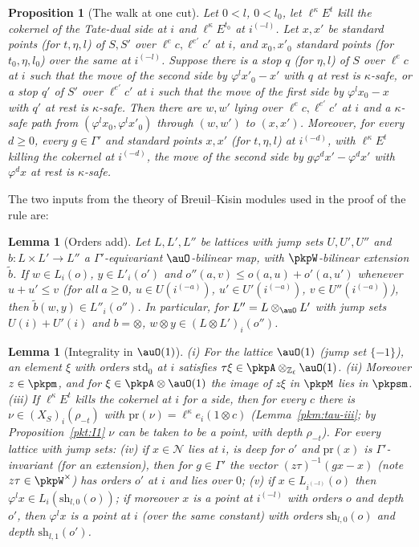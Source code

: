 \documentclass[10pt]{amsart}
\newtheorem{proposition}[theorem]{Proposition}
\newtheorem{lemma}[theorem]{Lemma}
\theoremstyle{definition}
\theoremstyle{remark}
\newcommand{\Z}{\mathbb Z}
\begin{document}
\begin{proposition}[The walk at one cut]\label{pkp:cut}
Let $0<l$, $0<l_0$, let $\ell^\kappa E^t$ kill the cokernel of the Tate-dual side at $i$ and
$\ell^\kappa E^{t_0}$ at $i^{(-l)}$. Let $x,x'$ be standard points (for $t,\eta,l$) of $S,S'$ over
$\ell^ec,\ell^{e'}c'$ at $i$, and $x_0,x'_0$ standard points (for $t_0,\eta,l_0$) over the same at
$i^{(-l)}$. Suppose there is a stop $q$ (for $\eta,l$) of $S$ over $\ell^ec$ at $i$ such that the move
of the second side by $\varphi^lx'_0-x'$ with $q$ at rest is $\kappa$-safe, or a stop $q'$ of $S'$
over $\ell^{e'}c'$ at $i$ such that the move of the first side by $\varphi^lx_0-x$ with $q'$ at rest
is $\kappa$-safe. Then there are $w,w'$ lying over $\ell^ec,\ell^{e'}c'$ at $i$ and a $\kappa$-safe
path from $(\varphi^lx_0,\varphi^lx'_0)$ through $(w,w')$ to $(x,x')$. Moreover, for every $d\ge0$,
every $g\in\Gamma'$ and standard points $x,x'$ (for $t,\eta,l$) at $i^{(-d)}$, with $\ell^\kappa E^t$
killing the cokernel at $i^{(-d)}$, the move of the second side by
$g\varphi^dx'-\varphi^dx'$ with $\varphi^dx$ at rest is $\kappa$-safe.
\end{proposition}

The two inputs from the theory of Breuil--Kisin modules used in the proof of the rule are:

\begin{lemma}[Orders add]\label{pkp:orders-add}
Let $L,L',L''$ be lattices with jump sets $U,U',U''$ and $b\colon L\times L'\to L''$ a
$\Gamma'$-equivariant $\auO$-bilinear map, with $\pkpW$-bilinear extension $\tilde b$. If $w\in L_i(o)$,
$y\in L'_i(o')$ and $o''(a,v)\le o(a,u)+o'(a,u')$ whenever $u+u'\le v$ (for all $a\ge0$,
$u\in U(i^{(-a)})$, $u'\in U'(i^{(-a)})$, $v\in U''(i^{(-a)})$), then $\tilde b(w,y)\in L''_i(o'')$.
In particular, for $L''=L\otimes_\auO L'$ with jump sets $U(i)+U'(i)$ and $b=\otimes$,
$w\otimes y\in(L\otimes L')_i(o'')$.
\end{lemma}

\begin{lemma}[Integrality in $\auO(1)$]\label{pkp:tau}
(i) For the lattice $\auO(1)$ (jump set $\{-1\}$), an element $\xi$ with orders $\mathrm{std}_0$ at $i$
satisfies $\tau\xi\in\pkpA\otimes_{\Z_\ell}\auO(1)$. (ii) Moreover $z\in\pkpm$, and for $\xi\in
\pkpA\otimes\auO(1)$ the image of $z\xi$ in $\pkpM$ lies in $\pkpsm$. (iii) If $\ell^\kappa E^t$ kills the
cokernel at $i$ for a side, then for every $c$ there is $\nu\in(X_S)_i(\rho_{-t})$ with
$\mathrm{pr}(\nu)=\ell^\kappa e_i(1\otimes c)$ (Lemma~\ref{pkm:tau-iii}; by Proposition~\ref{pkt:I1}
$\nu$ can be taken to be a point, with depth $\rho_{-t}$). For every lattice with jump sets: (iv) if $x\in\mathcal N$ lies at $i$,
is deep for $o'$ and $\mathrm{pr}(x)$ is $\Gamma'$-invariant (for an extension), then for $g\in\Gamma'$
the vector $(z\tau)^{-1}(gx-x)$ (note $z\tau\in\pkpW^\times$) has orders $o'$ at $i$ and lies over
$0$; (v) if $x\in L_{i^{(-l)}}(o)$ then $\varphi^lx\in L_i(\mathrm{sh}_{l,0}(o))$; if moreover $x$ is a point at
$i^{(-l)}$ with orders $o$ and depth $o'$, then $\varphi^lx$ is a point at $i$ (over the same constant)
with orders $\mathrm{sh}_{l,0}(o)$ and depth $\mathrm{sh}_{l,1}(o')$.
\end{lemma}
\end{document}
